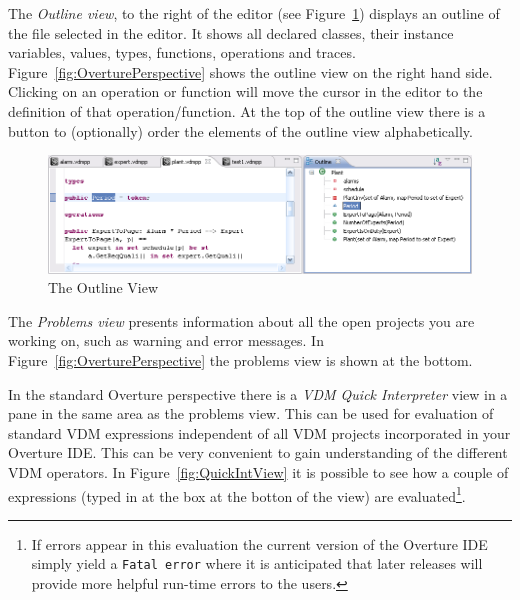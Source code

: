 

The \emph{Outline view}, to the right of the editor (see
Figure~\ref{fig:OutlineView}) displays an outline of the file selected
in the editor. It shows all declared classes, their instance variables,
values, types, functions, operations and traces.
Figure~\ref{fig:OverturePerspective} shows the outline view on the
right hand side. Clicking on an operation or function will move the
cursor in the editor to the definition of that operation/function. At
the top of the outline view there is a button to (optionally) order
the elements of the outline view alphabetically.

\begin{figure}[!htb]
\begin{center}
  \includegraphics[width=4.5in]{figures/OutlineView}
  \caption[labelInTOC]{The Outline View}
  \label{fig:OutlineView}
\end{center}
\end{figure}

The \emph{Problems view} presents information about all the open projects you
are working on, such as warning and error messages. In
Figure~\ref{fig:OverturePerspective} the problems view is shown at the bottom.

In the standard Overture perspective there is a \emph{VDM Quick
  Interpreter} view in a pane in the same area as the problems
view. This can be used for evaluation of standard VDM expressions
independent of all VDM projects incorporated in your Overture
IDE. This can be very convenient to gain understanding of the
different VDM operators. In Figure~\ref{fig:QuickIntView} it is
possible to see how a couple of expressions (typed in at the box at
the botton of the view) are evaluated\footnote{If errors appear in
  this evaluation the current version of the Overture IDE simply yield
  a \texttt{Fatal error} where it is anticipated that later releases
  will provide more helpful run-time errors to the users.}. 

